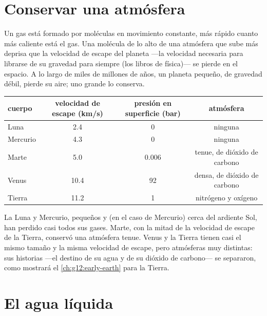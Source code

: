 \section{Conservar una atmósfera}

Un gas está formado por moléculas en movimiento constante, más rápido cuanto
más caliente está el gas. Una molécula de lo alto de una atmósfera que sube
más deprisa que la velocidad de escape del planeta ---la velocidad necesaria
para librarse de su gravedad para siempre (los libros de física)--- se
pierde en el espacio. A lo largo de miles de millones de años, un planeta
pequeño, de gravedad débil, pierde su aire; uno grande lo conserva.

\begin{center}
\small
\begin{tabular}{lccc}
\hline
cuerpo & velocidad de escape (\unit{km/s}) & presión en superficie (bar) & atmósfera \\
\hline
Luna & 2.4 & 0 & ninguna \\
Mercurio & 4.3 & 0 & ninguna \\
Marte & 5.0 & 0.006 & tenue, de dióxido de carbono \\
Venus & 10.4 & 92 & densa, de dióxido de carbono \\
Tierra & 11.2 & 1 & nitrógeno y oxígeno \\
\hline
\end{tabular}
\end{center}

\begin{remark}\label{rem:g10:habitable-planet:size}
La Luna y Mercurio, pequeños y (en el caso de Mercurio) cerca del ardiente
Sol, han perdido casi todos sus gases. Marte, con la mitad de la velocidad de
escape de la Tierra, conservó una atmósfera tenue. Venus y la Tierra tienen
casi el mismo tamaño y la misma velocidad de escape, pero atmósferas muy
distintas: sus historias ---el destino de su agua y de su dióxido de
carbono--- se separaron, como mostrará el \cref{ch:g12:early-earth} para la
Tierra.
\end{remark}

\section{El agua líquida}


